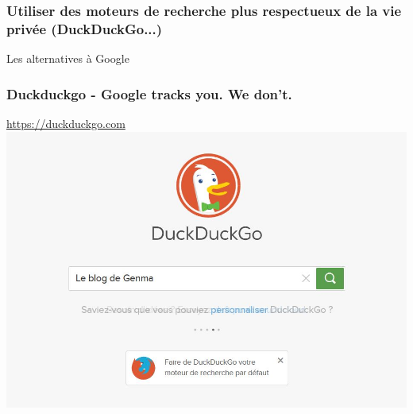 \documentclass{beamer}
\begin{document}
\begin{frame}
\frametitle{Utiliser des moteurs de recherche plus respectueux de la vie privée (DuckDuckGo...)}

\begin{block}{Les alternatives à Google}
\end{block}
\end{frame}

\begin{frame}
\begin{center}
\frametitle{Duckduckgo - Google tracks you. We don't.}

\url{https://duckduckgo.com}
\\
\includegraphics[scale=0.6] {./images/DuckDuckGo.jpg}
\end{center}
\end{frame}
\end{document}
